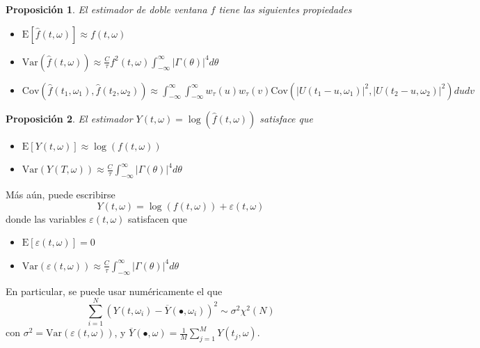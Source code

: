 \documentclass{beamer}
\newtheorem{prop}{Proposici\'on}
\newcommand{\intR}{\int_{-\infty}^{\infty}}
\newcommand{\est}[1]{\widehat{ #1 }}
\newcommand{\E}[1]{\mathrm{E}\left[ #1 \right]}
\newcommand{\Var}[1]{\mathrm{Var}\left( #1 \right)}
\newcommand{\Cov}[1]{\mathrm{Cov}\left( #1 \right)}
\newcommand{\abso}[1]{\left| #1 \right|}
\begin{document}

\begin{frame}%
\begin{prop}
El estimador de doble ventana $\widehat{f}$ tiene las siguientes propiedades
\begin{itemize}
\item $\displaystyle \E{\est{f}(t,\omega)} \approx f(t,\omega)$
\item $\displaystyle \Var{\est{f}(t,\omega)} \approx 
\frac{C}{\tau} f^{2}(t,\omega) \intR \abso{\Gamma (\theta)}^{4} d\theta$
\item $\displaystyle \Cov{\est{f}(t_1,\omega_1) , \est{f}(t_2,\omega_2)} \approx \intR \intR
w_\tau (u) w_\tau(v) \Cov{ \abso{U(t_1-u,\omega_1)}^{2} , \abso{U(t_2-u,\omega_2)}^{2} } du dv$
\end{itemize}
\end{prop}

\begin{prop}
El estimador $ Y(t,\omega) = \log{\left( \est{f}(t,\omega)\right)}$ satisface que
\begin{itemize}
\item $\displaystyle 
\E{ Y(t,\omega) } \approx \log \left( f(t,\omega) \right)$
\item $\displaystyle 
\Var{ Y(T,\omega) } 
\approx \frac{C}{\tau} \intR \abso{\Gamma (\theta)}^{4} d\theta $
\end{itemize}
\end{prop}
\end{frame}


\begin{frame}%
M\'as a\'un, puede escribirse
\begin{equation*}
Y(t,\omega) = \log \left( f(t,\omega) \right) + \varepsilon(t,\omega)
\end{equation*}
donde las variables $\varepsilon(t,\omega)$ satisfacen que
\begin{itemize}
\item $\displaystyle \E{\varepsilon(t,\omega)} = 0$
\item $\displaystyle \Var{\varepsilon(t,\omega)}
\approx \frac{C}{\tau} \intR \abso{\Gamma (\theta)}^{4} d\theta$
\end{itemize}

En particular, se puede usar num\'ericamente el que
\begin{equation*}
\sum_{i = 1 }^{N} \left( Y(t,\omega_i) - \overline{Y}(\bullet,\omega_i) \right)^{2} 
\sim \sigma^{2} \chi^{2}(N)
\end{equation*}
con $\sigma^{2} = \Var{\varepsilon(t,\omega)}$, y
$\overline{Y}(\bullet,\omega) = \frac{1}{M} \sum_{j=1}^{M} Y(t_j,\omega)$.
\end{frame}
\end{document}
